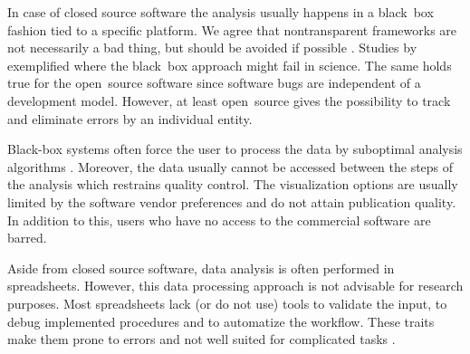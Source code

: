 In case of closed source software the analysis usually happens in a black~box 
fashion tied to a specific platform. We agree that nontransparent frameworks are 
not necessarily a bad thing, but should be avoided if possible 
\citep{roediger_RJ_2013, Spiess_2014}. Studies by \citet{mccullough_2008, 
Almiron_2010, Duran_2014} exemplified where the black~box approach might fail in 
science. The same holds true for the open~source software since software bugs 
are independent of a development model. However, at least open~source gives the 
possibility to track and eliminate errors by an individual entity. 

Black-box systems often force the user to process the data by suboptimal 
analysis algorithms \citep{ruijter_2013}. Moreover, the data usually cannot be 
accessed between the steps of the analysis which restrains quality control. The 
visualization options are usually limited by the software vendor preferences and 
do not attain publication quality. In addition to this, users who have no access 
to the commercial software are barred. 

Aside from closed source software, data analysis is often performed in 
spreadsheets. However, this data processing approach is not advisable for 
research purposes. Most spreadsheets  lack (or do not use) tools to validate the 
input, to debug implemented procedures and to automatize the workflow. These 
traits make them prone to errors and not well suited for complicated tasks 
\citep{mccullough_2008, burns_2014}.

